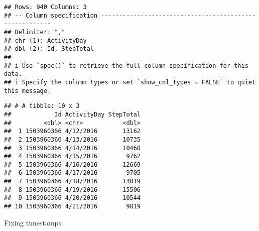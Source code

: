 \documentclass[
]{article}
\begin{document}
\begin{verbatim}
## Rows: 940 Columns: 3
## -- Column specification --------------------------------------------------------
## Delimiter: ","
## chr (1): ActivityDay
## dbl (2): Id, StepTotal
## 
## i Use `spec()` to retrieve the full column specification for this data.
## i Specify the column types or set `show_col_types = FALSE` to quiet this message.
\end{verbatim}

\begin{verbatim}
## # A tibble: 10 x 3
##            Id ActivityDay StepTotal
##         <dbl> <chr>           <dbl>
##  1 1503960366 4/12/2016       13162
##  2 1503960366 4/13/2016       10735
##  3 1503960366 4/14/2016       10460
##  4 1503960366 4/15/2016        9762
##  5 1503960366 4/16/2016       12669
##  6 1503960366 4/17/2016        9705
##  7 1503960366 4/18/2016       13019
##  8 1503960366 4/19/2016       15506
##  9 1503960366 4/20/2016       10544
## 10 1503960366 4/21/2016        9819
\end{verbatim}

Fixing timestamps
\end{document}
